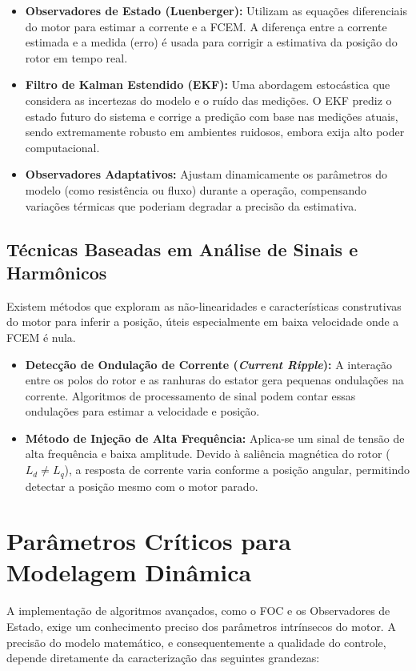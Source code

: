 \begin{itemize}
    \item \textbf{Observadores de Estado (Luenberger):} Utilizam as equações diferenciais do motor para estimar a corrente e a FCEM. A diferença entre a corrente estimada e a medida (erro) é usada para corrigir a estimativa da posição do rotor em tempo real.
    \item \textbf{Filtro de Kalman Estendido (EKF):} Uma abordagem estocástica que considera as incertezas do modelo e o ruído das medições. O EKF prediz o estado futuro do sistema e corrige a predição com base nas medições atuais, sendo extremamente robusto em ambientes ruidosos, embora exija alto poder computacional.
    \item \textbf{Observadores Adaptativos:} Ajustam dinamicamente os parâmetros do modelo (como resistência ou fluxo) durante a operação, compensando variações térmicas que poderiam degradar a precisão da estimativa.
\end{itemize}

\subsection{Técnicas Baseadas em Análise de Sinais e Harmônicos}
Existem métodos que exploram as não-linearidades e características construtivas do motor para inferir a posição, úteis especialmente em baixa velocidade onde a FCEM é nula.
\begin{itemize}
    \item \textbf{Detecção de Ondulação de Corrente (\textit{Current Ripple}):} A interação entre os polos do rotor e as ranhuras do estator gera pequenas ondulações na corrente. Algoritmos de processamento de sinal podem contar essas ondulações para estimar a velocidade e posição.
    \item \textbf{Método de Injeção de Alta Frequência:} Aplica-se um sinal de tensão de alta frequência e baixa amplitude. Devido à saliência magnética do rotor ($L_d \neq L_q$), a resposta de corrente varia conforme a posição angular, permitindo detectar a posição mesmo com o motor parado.
\end{itemize}

\section{Parâmetros Críticos para Modelagem Dinâmica}
\label{sec:parametros_modelagem}

A implementação de algoritmos avançados, como o FOC e os Observadores de Estado, exige um conhecimento preciso dos parâmetros intrínsecos do motor. A precisão do modelo matemático, e consequentemente a qualidade do controle, depende diretamente da caracterização das seguintes grandezas:

